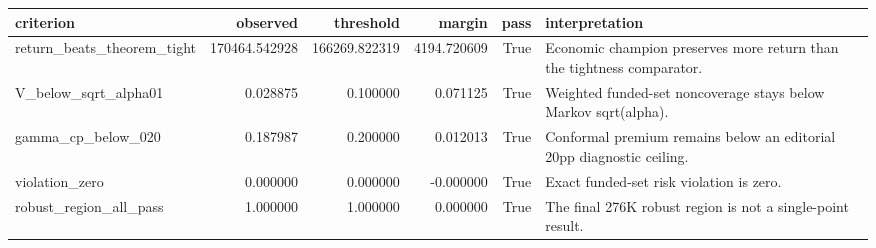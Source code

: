 \begin{tabular}{lrrrrl}
\toprule
criterion & observed & threshold & margin & pass & interpretation \\
\midrule
return\_beats\_theorem\_tight & 170464.542928 & 166269.822319 & 4194.720609 & True & Economic champion preserves more return than the tightness comparator. \\
V\_below\_sqrt\_alpha01 & 0.028875 & 0.100000 & 0.071125 & True & Weighted funded-set noncoverage stays below Markov sqrt(alpha). \\
gamma\_cp\_below\_020 & 0.187987 & 0.200000 & 0.012013 & True & Conformal premium remains below an editorial 20pp diagnostic ceiling. \\
violation\_zero & 0.000000 & 0.000000 & -0.000000 & True & Exact funded-set risk violation is zero. \\
robust\_region\_all\_pass & 1.000000 & 1.000000 & 0.000000 & True & The final 276K robust region is not a single-point result. \\
\bottomrule
\end{tabular}
